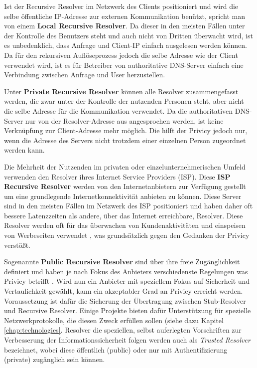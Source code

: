 Ist der Recursive Resolver im Netzwerk des Clients positioniert und wird die selbe öffentliche IP-Adresse zur externen Kommunikation benützt, spricht man von einem \textbf{Local Recursive Resolver}. Da dieser in den meisten Fällen unter der Kontrolle des Benutzers steht und auch nicht von Dritten überwacht wird, ist es unbedenklich, dass Anfrage und Client-IP einfach ausgelesen werden können. Da für den rekursiven Auflöseprozess jedoch die selbe Adresse wie der Client verwendet wird, ist es für Betreiber von authoritative DNS-Server einfach eine Verbindung zwischen Anfrage und User herzustellen.  

Unter \textbf{Private Recursive Resolver} können alle Resolver zusammengefasst werden, die zwar unter der Kontrolle der nutzenden Personen steht, aber nicht die selbe Adresse für die Kommunikation verwendet. Da die authoritativen DNS-Server nur von der Resolver-Adresse aus angesprochen werden, ist keine Verknüpfung zur Client-Adresse mehr möglich. Die hilft der Privicy jedoch nur, wenn die Adresse des Servers nicht trotzdem einer einzelnen Person zugeordnet werden kann.

Die Mehrheit der Nutzenden im privaten oder einzelunternehmerischen Umfeld verwenden den Resolver ihres Internet Service Providers (ISP). Diese \textbf{ISP Recursive Resolver} werden von den Internetanbietern zur Verfügung gestellt um eine grundlegende Internetkonnektivität anbieten zu können. Diese Server sind in den meisten Fällen im Netzwerk des ISP positioniert und haben daher oft bessere Latenzzeiten als andere, über das Internet erreichbare, Resolver. Diese Resolver werden oft für das überwachen von Kundenaktivitäten und einspeisen von Werbeseiten verwendet \cite{Weaver2011}, was grundsätzlich gegen den Gedanken der Privicy verstößt.

Sogenannte \textbf{Public Recursive Resolver} sind über ihre freie Zugänglichkeit definiert und haben je nach Fokus des Anbieters verschiedenste Regelungen was Privicy betrifft \cite{Prince2018}\cite{Quad92018}. Wird nun ein Anbieter mit speziellem Fokus auf Sicherheit und Vertaulichkeit gewählt, kann ein akzeptabler Grad an Privicy erreicht werden. Voraussetzung ist dafür die Sicherung der Übertragung zwischen Stub-Resolver und Recursive Resolver. Einige Projekte bieten dafür Unterstützung für spezielle Netzwerkprotokolle, die diesen Zweck erfüllen sollen (siehe dazu Kapitel \ref{chap:technologies}. Resolver die speziellen, selbst auferlegten Vorschriften zur Verbesserung der Informationssicherheit folgen werden auch als \textit{Trusted Resolver} bezeichnet, wobei diese öffentlich (public) oder nur mit Authentifizierung (private) zugänglich sein können.

